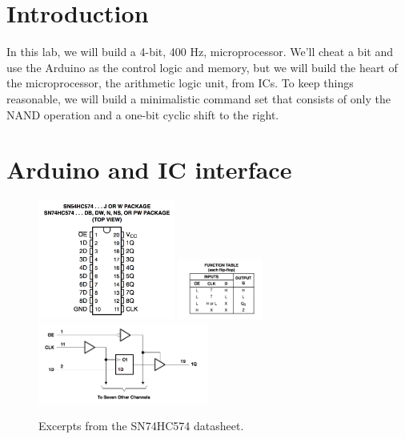 \documentclass[12pt]{article}
\begin{document}
\section{Introduction}

In this lab, we will build a 4-bit, 400 Hz, microprocessor.  We'll cheat a bit and use the Arduino as the control logic and memory, but we will build the heart of the microprocessor, the arithmetic logic unit, from ICs.  To keep things reasonable, we will build a minimalistic command set that consists of only the NAND operation and a one-bit cyclic shift to the right.

\section{Arduino and IC interface}

\begin{figure}[htbp]
\begin{center}
{\includegraphics[width=0.40\textwidth]{figs/SN74HC574_pinout.png}}
{\includegraphics[width=0.25\textwidth]{figs/SN74HC574_table.png}}
{\includegraphics[width=0.50\textwidth]{figs/SN74HC574_diagram.png}}
\end{center}
\caption{\label{fig:hc574} Excerpts from the SN74HC574 datasheet.}
\end{figure}
\end{document}
